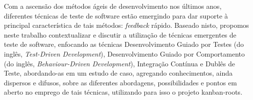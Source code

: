 \begin{resumo}
Com a ascensão dos métodos ágeis de desenvolvimento nos últimos anos, diferentes técnicas de teste de software estão emergindo para dar suporte à principal característica de tais métodos: \textit{feedback} rápido. Baseado nisto, propomos neste trabalho contextualizar e discutir a utilização de técnicas emergentes de teste de software, enfocando as técnicas Desenvolvimento Guiado por Testes (do inglês, \textit{Test-Driven Development}), Desenvolvimento Guiado por Comportamento (do inglês, \textit{Behaviour-Driven Development}), Integração Contínua e Dublês de Teste, abordando-as em um estudo de caso, agregando conhecimentos, ainda dispersos e difusos, sobre as diferentes abordagens, possibilidades e pontos em aberto no emprego de tais técnicas, utilizando para isso o projeto kanban-roots.
\end{resumo}